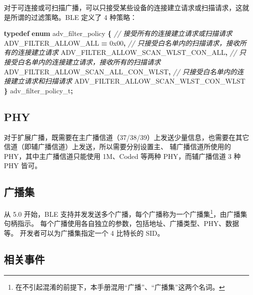\documentclass[
  12pt,
]{book}
\newenvironment{Shaded}{\begin{snugshade}}{\end{snugshade}}
\newcommand{\BaseNTok}[1]{\textcolor[rgb]{0.00,0.00,0.81}{#1}}
\newcommand{\CommentTok}[1]{\textcolor[rgb]{0.56,0.35,0.01}{\textit{#1}}}
\newcommand{\KeywordTok}[1]{\textcolor[rgb]{0.13,0.29,0.53}{\textbf{#1}}}
\newcommand{\NormalTok}[1]{#1}
\newcommand{\OperatorTok}[1]{\textcolor[rgb]{0.81,0.36,0.00}{\textbf{#1}}}
\begin{document}
对于可连接或可扫描广播，可以只接受某些设备的连接建立请求或扫描请求，这就是所谓的过滤策略。BLE 定义了 4 种策略：

\begin{Shaded}
\begin{Highlighting}[]
\KeywordTok{typedef} \KeywordTok{enum}\NormalTok{ adv\_filter\_policy}
\OperatorTok{\{}
    \CommentTok{// 接受所有的连接建立请求或扫描请求}
\NormalTok{    ADV\_FILTER\_ALLOW\_ALL    }\OperatorTok{=} \BaseNTok{0x00}\OperatorTok{,}
    \CommentTok{// 只接受白名单内的扫描请求，接收所有的连接建立请求}
\NormalTok{    ADV\_FILTER\_ALLOW\_SCAN\_WLST\_CON\_ALL}\OperatorTok{,}
    \CommentTok{// 只接受白名单内的连接建立请求，接收所有的扫描请求}
\NormalTok{    ADV\_FILTER\_ALLOW\_SCAN\_ALL\_CON\_WLST}\OperatorTok{,}
    \CommentTok{// 只接受白名单内的连接建立请求和扫描请求}
\NormalTok{    ADV\_FILTER\_ALLOW\_SCAN\_WLST\_CON\_WLST}
\OperatorTok{\}}\NormalTok{ adv\_filter\_policy\_t}\OperatorTok{;}
\end{Highlighting}
\end{Shaded}

\hypertarget{phy}{%
\subsection{PHY}\label{phy}}

对于扩展广播，既需要在主广播信道（37/38/39）上发送少量信息，也需要在其它信道（即辅广播信道）上发送，所以需要分别设置主、
辅广播信道所使用的 PHY，其中主广播信道只能使用 1M、Coded 等两种 PHY，而辅广播信道 3 种 PHY 皆可。

\hypertarget{ux5e7fux64adux96c6}{%
\subsection{广播集}\label{ux5e7fux64adux96c6}}

从 5.0 开始，BLE 支持并发发送多个广播，每个广播称为一个广播集\footnote{在不引起混淆的前提下，本手册混用``广播''、``广播集''这两个名词。}，由广播集句柄指示。
每个广播使用各自独立的参数，包括地址、广播类型、PHY、数据等。
开发者可以为广播集指定一个 4 比特长的 SID。

\hypertarget{ux76f8ux5173ux4e8bux4ef6}{%
\subsection{相关事件}\label{ux76f8ux5173ux4e8bux4ef6}}
\end{document}
